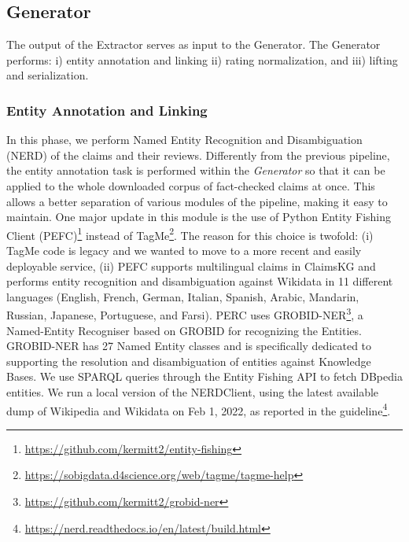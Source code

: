 \documentclass[
]{ceurart}
\begin{document}
\vspace{-4mm}
\subsection{\textbf{Generator}} The output of the Extractor serves as input to the Generator. The Generator performs: i) entity annotation and linking ii) rating normalization, and iii) lifting and serialization.

\vspace{-4mm}
\subsubsection{\textbf{Entity Annotation and Linking}}
\vspace{-1mm}
In this phase, we perform Named Entity Recognition and Disambiguation (NERD) of the claims and their reviews. %
Differently from the previous pipeline, the entity annotation task is performed within the \textit{Generator} so that it can be applied to the whole downloaded corpus of fact-checked claims at once. This allows a better separation of various modules of the pipeline, making it easy to maintain. %
One major update in this module is the use of Python Entity Fishing Client (PEFC)\footnote{\url{https://github.com/kermitt2/entity-fishing}} instead of TagMe\footnote{\url{https://sobigdata.d4science.org/web/tagme/tagme-help}}. 
The reason for this choice is twofold: (i) TagMe code is legacy and we wanted to move to a more recent and easily deployable service, (ii) PEFC supports multilingual claims in ClaimsKG and performs entity recognition and disambiguation against Wikidata in 11 different languages (English, French, German, Italian, Spanish, Arabic, Mandarin, Russian, Japanese, Portuguese, and Farsi).
PERC uses GROBID-NER\footnote{\url{https://github.com/kermitt2/grobid-ner}}, a Named-Entity Recogniser based on GROBID for recognizing the Entities. GROBID-NER has 27 Named Entity classes and is specifically dedicated to supporting the resolution and disambiguation of entities against Knowledge Bases. We use SPARQL queries through the Entity Fishing API to fetch DBpedia entities. We run a local version of the NERDClient, using the latest available dump of Wikipedia and Wikidata on Feb 1, 2022, as reported in the guideline\footnote{\url{https://nerd.readthedocs.io/en/latest/build.html}}. 
\vspace{-4mm}
\end{document}
